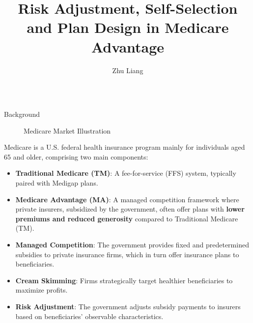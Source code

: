 \documentclass{beamer}
\title{Risk Adjustment, Self-Selection and Plan Design in Medicare Advantage}
\author{ Zhu Liang}
\institute{ Stony Brook University}
\begin{document}
\begin{frame}[t]
  \linespread{1.2}\selectfont
  \begin{columns}[t]
    \begin{column}{.3\textwidth}
      \begin{block}{Background}
        \begin{figure}[ht]
          \centering
          \scriptsize
          \resizebox{0.5\linewidth}{!}{%
          
        }
          \caption{Medicare Market Illustration}
        \end{figure}
        Medicare is a U.S. federal health insurance program mainly for individuals aged 65 and older, comprising two main components:
        \begin{itemize}
          \item \textbf{Traditional Medicare (TM)}: A fee-for-service (FFS) system, typically paired with Medigap plans.
          \item \textbf{Medicare Advantage (MA)}: A managed competition framework where private insurers, subsidized by the government, often offer plans with \textbf{lower premiums and reduced generosity} compared to Traditional Medicare (TM).
        \end{itemize}
        \begin{itemize}
          \item \textbf{Managed Competition}: The government provides fixed and predetermined subsidies to private insurance firms, which in turn offer insurance plans to beneficiaries.
          \item \textbf{Cream Skimming}: Firms strategically target healthier beneficiaries to maximize profits.
          \item \textbf{Risk Adjustment}: The government adjusts subsidy payments to insurers based on beneficiaries' observable characteristics.
        \end{itemize}
      \end{block}


\end{column}
\end{columns}
\end{frame}
\end{document}
